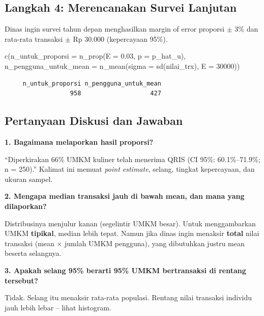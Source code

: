 \documentclass[
  indonesian,
  letterpaper,
]{book}
\newenvironment{Shaded}{\begin{snugshade}}{\end{snugshade}}
\newcommand{\AttributeTok}[1]{\textcolor[rgb]{0.40,0.45,0.13}{#1}}
\newcommand{\DecValTok}[1]{\textcolor[rgb]{0.68,0.00,0.00}{#1}}
\newcommand{\FloatTok}[1]{\textcolor[rgb]{0.68,0.00,0.00}{#1}}
\newcommand{\FunctionTok}[1]{\textcolor[rgb]{0.28,0.35,0.67}{#1}}
\newcommand{\NormalTok}[1]{\textcolor[rgb]{0.00,0.23,0.31}{#1}}
\begin{document}
\subsection{Langkah 4: Merencanakan Survei
Lanjutan}\label{langkah-4-merencanakan-survei-lanjutan}

Dinas ingin survei tahun depan menghasilkan margin of error proporsi
\(\pm\) 3\% dan rata-rata transaksi \(\pm\) Rp 30.000 (kepercayaan
95\%).

\begin{Shaded}
\begin{Highlighting}[]
\FunctionTok{c}\NormalTok{(}\AttributeTok{n\_untuk\_proporsi =} \FunctionTok{n\_prop}\NormalTok{(}\AttributeTok{E =} \FloatTok{0.03}\NormalTok{, }\AttributeTok{p =}\NormalTok{ p\_hat\_u),}
  \AttributeTok{n\_pengguna\_untuk\_mean =} \FunctionTok{n\_mean}\NormalTok{(}\AttributeTok{sigma =} \FunctionTok{sd}\NormalTok{(nilai\_trx), }\AttributeTok{E =} \DecValTok{30000}\NormalTok{))}
\end{Highlighting}
\end{Shaded}

\begin{verbatim}
     n_untuk_proporsi n_pengguna_untuk_mean 
                  958                   427 
\end{verbatim}

\subsection{Pertanyaan Diskusi dan
Jawaban}\label{pertanyaan-diskusi-dan-jawaban}

\textbf{1. Bagaimana melaporkan hasil proporsi?}

``Diperkirakan 66\% UMKM kuliner telah menerima QRIS (CI 95\%:
60.1\%--71.9\%; n = 250).'' Kalimat ini memuat \emph{point estimate},
selang, tingkat kepercayaan, dan ukuran sampel.

\textbf{2. Mengapa median transaksi jauh di bawah mean, dan mana yang
dilaporkan?}

Distribusinya menjulur kanan (segelintir UMKM besar). Untuk
menggambarkan UMKM \textbf{tipikal}, median lebih tepat. Namun jika
dinas ingin menaksir \textbf{total} nilai transaksi (mean \(\times\)
jumlah UMKM pengguna), yang dibutuhkan justru mean beserta selangnya.

\textbf{3. Apakah selang 95\% berarti 95\% UMKM bertransaksi di rentang
tersebut?}

Tidak. Selang itu menaksir rata-rata populasi. Rentang nilai transaksi
individu jauh lebih lebar -- lihat histogram.
\end{document}
